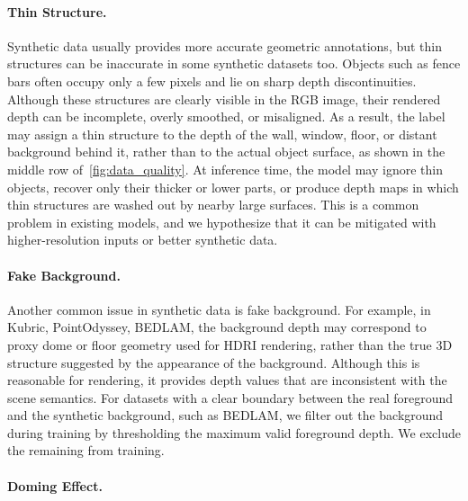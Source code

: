 \paragraph{Thin Structure.}

Synthetic data usually provides more accurate geometric annotations, but thin structures can be inaccurate in some synthetic datasets too.
Objects such as fence bars often occupy only a few pixels and lie on sharp depth discontinuities.
Although these structures are clearly visible in the RGB image, their rendered depth can be incomplete, overly smoothed, or misaligned.
As a result, the label may assign a thin structure to the depth of the wall, window, floor, or distant background behind it, rather than to the actual object surface, as shown in the middle row of~\cref{fig:data_quality}.
At inference time, the model may ignore thin objects, recover only their thicker or lower parts, or produce depth maps in which thin structures are washed out by nearby large surfaces.
This is a common problem in existing models, and we hypothesize that it can be mitigated with higher-resolution inputs or better synthetic data.

\paragraph{Fake Background.}

Another common issue in synthetic data is fake background.
For example, in Kubric, PointOdyssey, BEDLAM, the background depth may correspond to proxy dome or floor geometry used for HDRI rendering, rather than the true 3D structure suggested by the appearance of the background.
Although this is reasonable for rendering, it provides depth values that are inconsistent with the scene semantics.
For datasets with a clear boundary between the real foreground and the synthetic background, such as BEDLAM, we filter out the background during training by thresholding the maximum valid foreground depth.
We exclude the remaining from training.

\paragraph{Doming Effect.}

